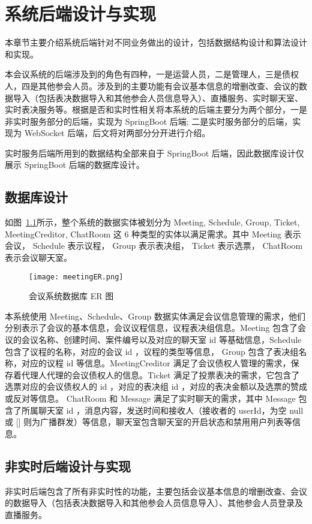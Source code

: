 \chapter{系统后端设计与实现}
本章节主要介绍系统后端针对不同业务做出的设计，包括数据结构设计和算法设计和实现。

本会议系统的后端涉及到的角色有四种，一是运营人员，二是管理人，三是债权人，四是其他参会人员。涉及到的主要功能有会议基本信息的增删改查、会议的数据导入（包括表决数据导入和其他参会人员信息导入）、直播服务、实时聊天室、实时表决服务等。根据是否和实时性相关将本系统的后端主要分为两个部分，一是非实时服务部分的后端，实现为 SpringBoot 后端; 二是实时服务部分的后端，实现为 WebSocket 后端，后文将对两部分分开进行介绍。

实时服务后端所用到的数据结构全部来自于 SpringBoot 后端，因此数据库设计仅展示 SpringBoot 后端的数据库设计。

\section{数据库设计}
如图~\ref{fig:meetingER}所示，整个系统的数据实体被划分为 Meeting, Schedule,
Group, Ticket, MeetingCreditor, ChatRoom 这 6 种类型的实体以满足需求。其中 Meeting 表示会议， Schedule 表示议程， Group 表示表决组， Ticket 表示选票， ChatRoom 表示会议聊天室。

\begin{figure}[!htp]
    \centering
    \texttt{[image: meetingER.png]}
    \caption{会议系统数据库 ER 图}
    \label{fig:meetingER}
  \end{figure}

本系统使用 Meeting、Schedule、Group 数据实体满足会议信息管理的需求，他们分别表示了会议的基本信息，会议议程信息，议程表决组信息。Meeting 包含了会议的会议名称、创建时间、案件编号以及对应的聊天室 id 等基础信息，Schedule 包含了议程的名称，对应的会议 id ，议程的类型等信息， Group 包含了表决组名称，对应的议程 id 等信息。MeetingCreditor 满足了会议债权人管理的需求，保存着代理人代理的会议债权人的信息。Ticket 满足了投票表决的需求，它包含了选票对应的会议债权人的 id ，对应的表决组 id ，对应的表决金额以及选票的赞成或反对等信息。 ChatRoom 和 Message 满足了实时聊天的需求，其中 Message 包含了所属聊天室 id ，消息内容，发送时间和接收人（接收者的 userId，为空 null 或 [] 则为广播群发）等信息，聊天室包含聊天室的开启状态和禁用用户列表等信息。

\section{非实时后端设计与实现}
非实时后端包含了所有非实时性的功能，主要包括会议基本信息的增删改查、会议的数据导入（包括表决数据导入和其他参会人员信息导入）、其他参会人员登录及直播服务。


